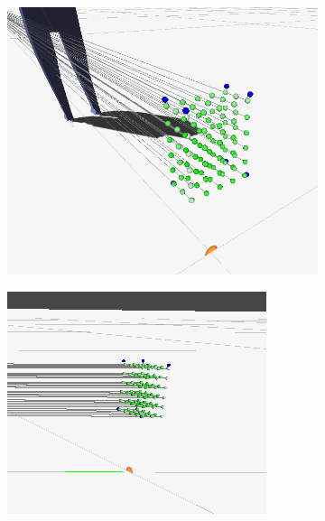 \begin{figure}[ht]
	\centering
	\begin{subfigure}[b]{0.49\textwidth}
		\includegraphics[width=\textwidth]{images/gizmos1.png}
	\end{subfigure}
	\begin{subfigure}[b]{0.49\textwidth}
		\includegraphics[width=\textwidth]{images/gizmos2.png}
	\end{subfigure}
	\par\medskip

\end{figure}
